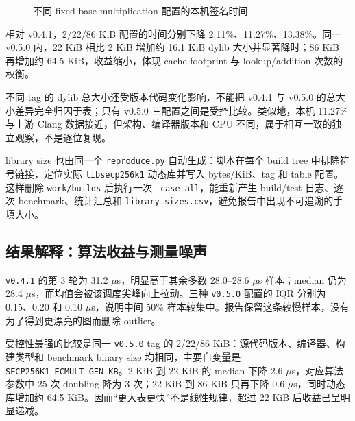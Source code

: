 \documentclass[11pt,a4paper,fontset=none]{ctexart}
\begin{document}
\begin{figure}[htbp]
\centering
{}
\caption{不同 fixed-base multiplication 配置的本机签名时间}
\end{figure}

相对 v0.4.1，2/22/86 KiB 配置的时间分别下降 2.11\%、11.27\%、13.38\%。同一 v0.5.0 内，22 KiB 相比 2 KiB 增加约 16.1 KiB dylib 大小并显著降时；86 KiB 再增加约 64.5 KiB，收益缩小，体现 cache footprint 与 lookup/addition 次数的权衡。

不同 tag 的 dylib 总大小还受版本代码变化影响，不能把 v0.4.1 与 v0.5.0 的总大小差异完全归因于表；只有 v0.5.0 三配置之间是受控比较。类似地，本机 11.27\% 与上游 Clang 数据接近，但架构、编译器版本和 CPU 不同，属于相互一致的独立观察，不是逐位复现。

library size 也由同一个 \texttt{reproduce.py} 自动生成：脚本在每个 build tree 中排除符号链接，定位实际 \texttt{libsecp256k1} 动态库并写入 bytes/KiB、tag 和 table 配置。这样删除 \texttt{work/builds} 后执行一次 \texttt{--case all}，能重新产生 build/test 日志、逐次 benchmark、统计汇总和 \texttt{library\_sizes.csv}，避免报告中出现不可追溯的手填大小。

\subsection{结果解释：算法收益与测量噪声}

\texttt{v0.4.1} 的第 3 轮为 31.2 $\mu$s，明显高于其余多数 28.0--28.6 $\mu$s 样本；median 仍为 28.4 $\mu$s，而均值会被该调度尖峰向上拉动。三种 \texttt{v0.5.0} 配置的 IQR 分别为 0.15、0.20 和 0.10 $\mu$s，说明中间 50\% 样本较集中。报告保留这条较慢样本，没有为了得到更漂亮的图而删除 outlier。

受控性最强的比较是同一 \texttt{v0.5.0} tag 的 2/22/86 KiB：源代码版本、编译器、构建类型和 benchmark binary size 均相同，主要自变量是 \texttt{SECP256K1\_ECMULT\_GEN\_KB}。2 KiB 到 22 KiB 的 median 下降 2.6 $\mu$s，对应算法参数中 25 次 doubling 降为 3 次；22 KiB 到 86 KiB 只再下降 0.6 $\mu$s，同时动态库增加约 64.5 KiB。因而“更大表更快”不是线性规律，超过 22 KiB 后收益已呈明显递减。
\end{document}
